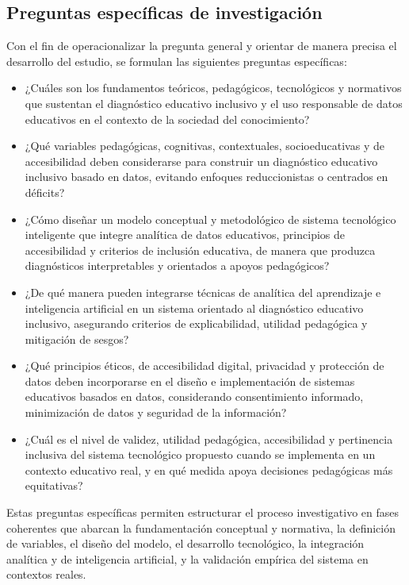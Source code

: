 \begin{refsection}
\section{Preguntas específicas de investigación}

Con el fin de operacionalizar la pregunta general y orientar de manera precisa el desarrollo del estudio, se formulan las siguientes preguntas específicas:

\begin{itemize}
\item ¿Cuáles son los fundamentos teóricos, pedagógicos, tecnológicos y normativos que sustentan el diagnóstico educativo inclusivo y el uso responsable de datos educativos en el contexto de la sociedad del conocimiento?

\item ¿Qué variables pedagógicas, cognitivas, contextuales, socioeducativas y de accesibilidad deben considerarse para construir un diagnóstico educativo inclusivo basado en datos, evitando enfoques reduccionistas o centrados en déficits?

\item ¿Cómo diseñar un modelo conceptual y metodológico de sistema tecnológico inteligente que integre analítica de datos educativos, principios de accesibilidad y criterios de inclusión educativa, de manera que produzca diagnósticos interpretables y orientados a apoyos pedagógicos?

\item ¿De qué manera pueden integrarse técnicas de analítica del aprendizaje e inteligencia artificial en un sistema orientado al diagnóstico educativo inclusivo, asegurando criterios de explicabilidad, utilidad pedagógica y mitigación de sesgos?

\item ¿Qué principios éticos, de accesibilidad digital, privacidad y protección de datos deben incorporarse en el diseño e implementación de sistemas educativos basados en datos, considerando consentimiento informado, minimización de datos y seguridad de la información?

\item ¿Cuál es el nivel de validez, utilidad pedagógica, accesibilidad y pertinencia inclusiva del sistema tecnológico propuesto cuando se implementa en un contexto educativo real, y en qué medida apoya decisiones pedagógicas más equitativas?
\end{itemize}

Estas preguntas específicas permiten estructurar el proceso investigativo en fases coherentes que abarcan la fundamentación conceptual y normativa, la definición de variables, el diseño del modelo, el desarrollo tecnológico, la integración analítica y de inteligencia artificial, y la validación empírica del sistema en contextos reales.


\end{refsection}
